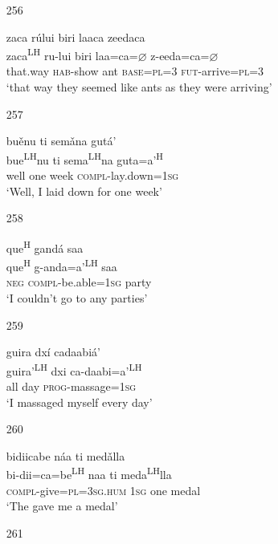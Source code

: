 \begin{itemize}
\item[256]
 
\glll   zaca r\'{u}lui biri laaca zeedaca\\
zaca\textsuperscript{LH} ru-lui biri laa=ca=$\varnothing$ z-eeda=ca=$\varnothing$\\
that.way \textsc{hab}-show ant \textsc{base}=\textsc{pl}=\textsc{3} \textsc{fut}-arrive=\textsc{pl}=\textsc{3}\\
\glt `that way they seemed like ants as they were arriving'
 


\item[257]
 
\glll   bu\v{e}nu ti sem\v{a}na gut\'{a}'\\
 bue\textsuperscript{LH}nu ti sema\textsuperscript{LH}na guta=a'\textsuperscript{H}\\
 well one week \textsc{compl}-lay.down=\textsc{1sg}\\
\glt `Well, I laid down for one week'
 

\item[258]
 
\glll   que\textsuperscript{H} gand\'{a} saa\\
que\textsuperscript{H} g-anda=a'\textsuperscript{LH} saa\\
\textsc{neg} \textsc{compl}-be.able=\textsc{1sg} party\\
\glt `I couldn't go to any parties'
 


\item[259]
 
\glll   guira dx\'{i} cadaabi\'{a}'\\
guira'\textsuperscript{LH} dxi ca-daabi=a'\textsuperscript{LH}\\
all day \textsc{prog}-massage=\textsc{1sg}\\
\glt `I massaged myself every day'
 



\item[260]
 
\glll   bidiicabe n\'{a}a ti med\v{a}lla\\
bi-dii=ca=be\textsuperscript{LH} naa ti meda\textsuperscript{LH}lla\\
\textsc{compl}-give=\textsc{pl}=\textsc{3sg.hum} \textsc{1sg} one medal\\
\glt `The gave me a medal'
 



\item[261]
 

\end{itemize}
